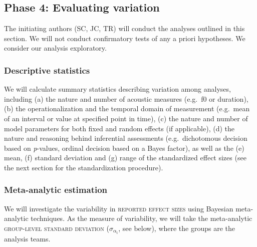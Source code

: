 \documentclass[Review,times,sageh]{sagej}
\begin{document}
\subsection{Phase 4: Evaluating
variation}\label{phase-4-evaluating-variation}

The initiating authors (SC, JC, TR) will conduct the analyses outlined
in this section. We will not conduct confirmatory tests of any a priori
hypotheses. We consider our analysis exploratory.

\subsubsection{Descriptive statistics}\label{descriptive-statistics}

We will calculate summary statistics describing variation among
analyses, including (a) the nature and number of acoustic measures
(e.g.~f0 or duration), (b) the operationalization and the temporal
domain of measurement (e.g.~mean of an interval or value at specified
point in time), (c) the nature and number of model parameters for both
fixed and random effects (if applicable), (d) the nature and reasoning
behind inferential assessments (e.g.~dichotomous decision based on
\emph{p}-values, ordinal decision based on a Bayes factor), as well as
the (e) mean, (f) standard deviation and (g) range of the standardized
effect sizes (see the next section for the standardization procedure).

\subsubsection{Meta-analytic estimation}\label{s:meta-est}

We will investigate the variability in \textsc{reported effect sizes}
using Bayesian meta-analytic techniques. As the measure of variability,
we will take the meta-analytic \textsc{group-level standard deviation}
(\(\sigma_{\alpha_{\text{t}}}\), see below), where the groups are the
analysis teams.
\end{document}
